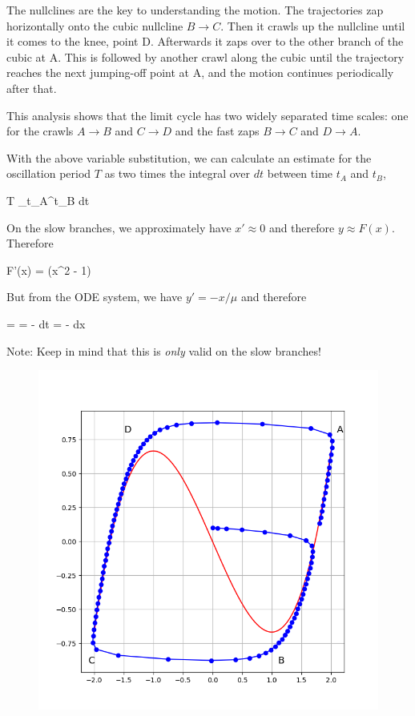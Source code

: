 The nullclines are the key to understanding the motion. The trajectories zap horizontally onto the cubic nullcline $B \rightarrow C$. Then it crawls up the nullcline until it comes to the knee, point D. Afterwards it zaps over to the other branch of the cubic at A. This is followed by another crawl along the cubic until the trajectory reaches the next jumping-off point at A, and the motion continues periodically after that.

This analysis shows that the limit cycle has two widely separated time scales: one for the crawls $A \rightarrow B$ and $C \rightarrow D$ and the fast zaps $B \rightarrow C$ and $D \rightarrow A$.

With the above variable substitution, we can calculate an estimate for the oscillation period $T$ as two times the integral over $dt$ between time $t_A$ and $t_B$,

\bee
T  \int_{t_A}^{t_B} dt
\eee

On the slow branches, we approximately have $x' \approx 0$ and therefore $y \approx F(x)$. Therefore

\bee
{} \approx F'(x)  = (x^2 - 1) 
\eee

But from the ODE system, we have $y' = -x / \mu$ and therefore

\bee
{} =   = -  \rightarrow dt = -  dx
\eee

Note: Keep in mind that this is \emph{only} valid on the slow branches!

\begin{figure}[H]
    \centering
    \includegraphics[scale=0.75]{images/2024-09-24-vanderpol_1.png}
\end{figure}

